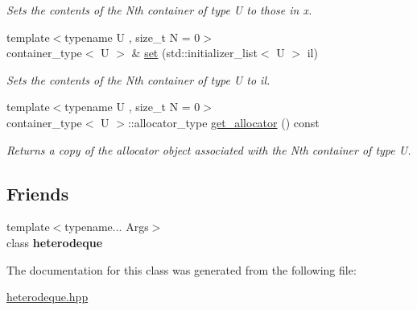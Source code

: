 \begin{DoxyCompactItemize}
\begin{DoxyCompactList}\small\item\em Sets the contents of the Nth container of type U to those in x. \end{DoxyCompactList}\item 
\hypertarget{classheterogeneous_1_1heterodeque_3_01_t_00_01_types_8_8_8_4_a9bb71cd278399d2b6c9ecfbed17fde40}{}{\footnotesize template$<$typename U , size\+\_\+t N = 0$>$ }\\container\+\_\+type$<$ U $>$ \& \hyperlink{classheterogeneous_1_1heterodeque_3_01_t_00_01_types_8_8_8_4_a9bb71cd278399d2b6c9ecfbed17fde40}{set} (std\+::initializer\+\_\+list$<$ U $>$ il)\label{classheterogeneous_1_1heterodeque_3_01_t_00_01_types_8_8_8_4_a9bb71cd278399d2b6c9ecfbed17fde40}

\begin{DoxyCompactList}\small\item\em Sets the contents of the Nth container of type U to il. \end{DoxyCompactList}\item 
\hypertarget{classheterogeneous_1_1heterodeque_3_01_t_00_01_types_8_8_8_4_a539c7ea552909eabd2f3680bd2e3949a}{}{\footnotesize template$<$typename U , size\+\_\+t N = 0$>$ }\\container\+\_\+type$<$ U $>$\+::allocator\+\_\+type \hyperlink{classheterogeneous_1_1heterodeque_3_01_t_00_01_types_8_8_8_4_a539c7ea552909eabd2f3680bd2e3949a}{get\+\_\+allocator} () const \label{classheterogeneous_1_1heterodeque_3_01_t_00_01_types_8_8_8_4_a539c7ea552909eabd2f3680bd2e3949a}

\begin{DoxyCompactList}\small\item\em Returns a copy of the allocator object associated with the Nth container of type U. \end{DoxyCompactList}\end{DoxyCompactItemize}
\subsection*{Friends}
\begin{DoxyCompactItemize}
\item 
\hypertarget{classheterogeneous_1_1heterodeque_3_01_t_00_01_types_8_8_8_4_a3d4800913c2d8380ff48d938c8dfcff5}{}{\footnotesize template$<$typename... Args$>$ }\\class {\bfseries heterodeque}\label{classheterogeneous_1_1heterodeque_3_01_t_00_01_types_8_8_8_4_a3d4800913c2d8380ff48d938c8dfcff5}

\end{DoxyCompactItemize}


The documentation for this class was generated from the following file\+:\begin{DoxyCompactItemize}
\item 
\hyperlink{heterodeque_8hpp}{heterodeque.\+hpp}\end{DoxyCompactItemize}
